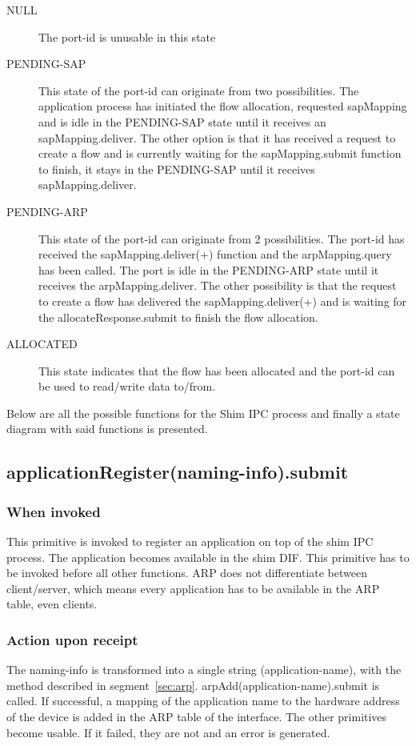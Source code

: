 \begin{description}
	\item[NULL] The port-id is unusable in this state
	\item[PENDING-SAP] This state of the port-id can originate from two possibilities. The application process has initiated the flow allocation, requested sapMapping and is idle in the PENDING-SAP state until it receives an sapMapping.deliver. The other option is that it has received a request to create a flow and is currently waiting for the sapMapping.submit function to finish, it stays in the PENDING-SAP until it receives sapMapping.deliver.
	\item[PENDING-ARP] This state of the port-id can originate from 2 possibilities. The port-id has received the sapMapping.deliver(+) function and the arpMapping.query has been called. The port is idle in the PENDING-ARP state until it receives the arpMapping.deliver. The other possibility is that the request to create a flow has delivered the sapMapping.deliver(+) and is waiting for the allocateResponse.submit to finish the flow allocation.
	\item[ALLOCATED] This state indicates that the flow has been allocated and the port-id can be used to read/write data to/from.
\end{description}

\npar

Below are all the possible functions for the Shim IPC process and finally a state diagram with said functions is presented.

\subsection{applicationRegister(naming-info).submit}
\subsubsection{When invoked}
This primitive is invoked to register an application on top of the shim IPC process.  The application becomes available in the shim DIF. This primitive has to be invoked before all other functions. ARP does not differentiate between client/server, which means every application has to be available in the ARP table, even clients.
\subsubsection{Action upon receipt}
The naming-info is transformed into a single string (application-name), with the method described in segment~\ref{sec:arp}. arpAdd(application-name).submit is called. If successful, a mapping of the application name to the hardware address of the device is added in the ARP table of the interface. The other primitives become usable. If it failed, they are not and an error is generated.


